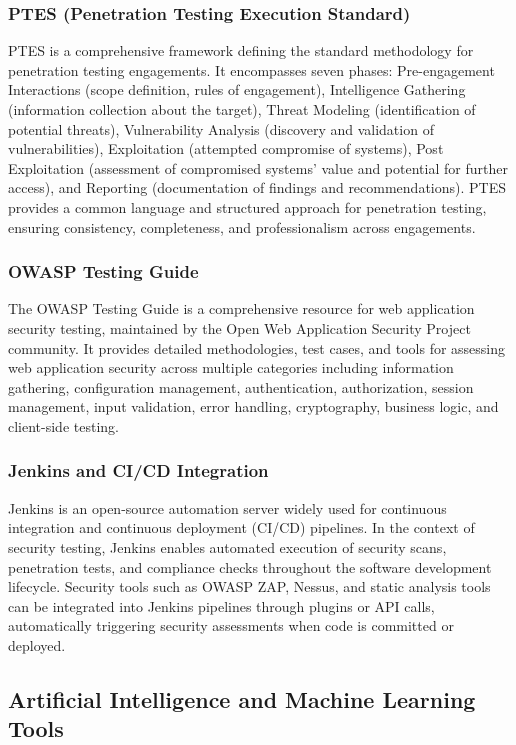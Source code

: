 \subsubsection{PTES (Penetration Testing Execution Standard)}
PTES is a comprehensive framework defining the standard methodology for penetration testing engagements. It encompasses seven phases: Pre-engagement Interactions (scope definition, rules of engagement), Intelligence Gathering (information collection about the target), Threat Modeling (identification of potential threats), Vulnerability Analysis (discovery and validation of vulnerabilities), Exploitation (attempted compromise of systems), Post Exploitation (assessment of compromised systems' value and potential for further access), and Reporting (documentation of findings and recommendations). PTES provides a common language and structured approach for penetration testing, ensuring consistency, completeness, and professionalism across engagements.

\subsubsection{OWASP Testing Guide}
The OWASP Testing Guide is a comprehensive resource for web application security testing, maintained by the Open Web Application Security Project community. It provides detailed methodologies, test cases, and tools for assessing web application security across multiple categories including information gathering, configuration management, authentication, authorization, session management, input validation, error handling, cryptography, business logic, and client-side testing.

\subsubsection{Jenkins and CI/CD Integration}
Jenkins is an open-source automation server widely used for continuous integration and continuous deployment (CI/CD) pipelines. In the context of security testing, Jenkins enables automated execution of security scans, penetration tests, and compliance checks throughout the software development lifecycle. Security tools such as OWASP ZAP, Nessus, and static analysis tools can be integrated into Jenkins pipelines through plugins or API calls, automatically triggering security assessments when code is committed or deployed.

\subsection{Artificial Intelligence and Machine Learning Tools}

